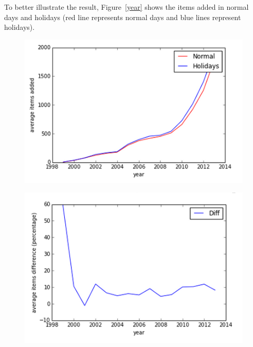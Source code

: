 To better illustrate the result, Figure~\ref{year} shows the items added in normal days and holidays (red line represents normal days and blue lines represent holidays). 


\begin{figure}[!h]
\centering
\begin{minipage}{.25\textwidth}
  \centering
  \includegraphics[width=.9\linewidth]{year.png}
  \label{year}
\end{minipage}%
\begin{minipage}{.25\textwidth}
  \centering
  \includegraphics[width=.9\linewidth]{holiday.png}
  \label{holiday}
\end{minipage}
\end{figure}


